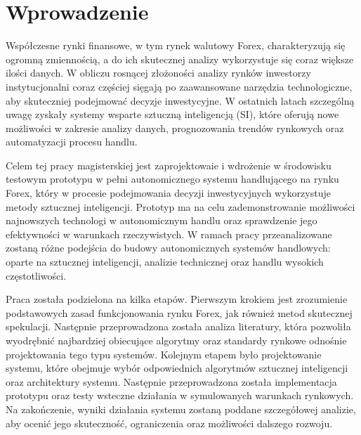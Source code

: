 \chapter*{Wprowadzenie}

Współczesne rynki finansowe, w tym rynek walutowy Forex, charakteryzują się ogromną zmiennością, a do ich skutecznej analizy wykorzystuje się coraz większe ilości danych. W obliczu rosnącej złożoności analizy rynków inwestorzy instytucjonalni coraz częściej sięgają po zaawansowane narzędzia technologiczne, aby skuteczniej podejmować decyzje inwestycyjne. W ostatnich latach szczególną uwagę zyskały systemy wsparte sztuczną inteligencją (SI), które oferują nowe możliwości w zakresie analizy danych, prognozowania trendów rynkowych oraz automatyzacji procesu handlu. 

Celem tej pracy magisterskiej jest zaprojektowaie i wdrożenie w środowisku testowym prototypu w pełni autonomicznego systemu handlującego na rynku Forex, który w procesie podejmowania decyzji inwestycyjnych wykorzystuje metody sztucznej inteligencji. Prototyp ma na celu zademonstrowanie możliwości najnowszych technologi w autonomicznym handlu oraz sprawdzenie jego efektywności w warunkach rzeczywistych. W ramach pracy przeanalizowane zostaną różne podejścia do budowy autonomicznych systemów handlowych: oparte na sztucznej inteligencji, analizie technicznej oraz handlu wysokich częstotliwości.

Praca została podzielona na kilka etapów. Pierwszym krokiem jest zrozumienie podstawowych zasad funkcjonowania rynku Forex, jak również metod skutecznej spekulacji. Następnie przeprowadzona została analiza literatury, która pozwoliła wyodrębnić najbardziej obiecujące algorytmy oraz standardy rynkowe odnośnie projektowania tego typu systemów. Kolejnym etapem było projektowanie systemu, które obejmuje wybór odpowiednich algorytmów sztucznej inteligencji oraz architektury systemu. Następnie przeprowadzona została implementacja prototypu oraz testy wsteczne działania w symulowanych warunkach rynkowych. Na zakończenie, wyniki działania systemu zostaną poddane szczegółowej analizie, aby ocenić jego skuteczność, ograniczenia oraz możliwości dalszego rozwoju.